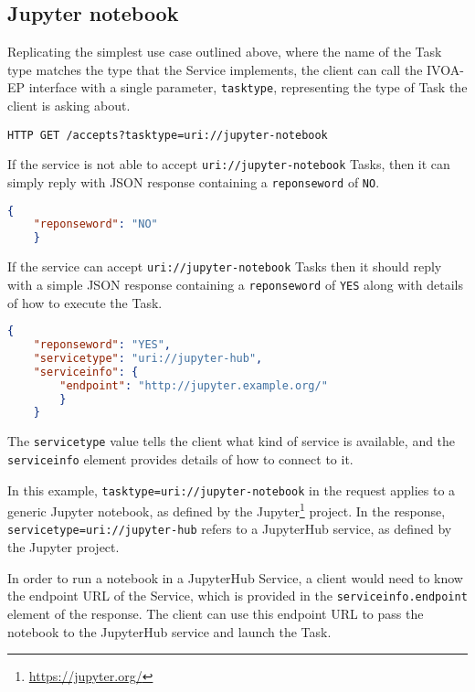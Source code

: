 \documentclass[11pt,a4paper]{ivoa}
\newcommand{\json} {JSON\xspace}
\newcommand{\ivoep} {IVOA-EP\xspace}
\newcommand{\jupyter} {Jupyter\xspace}
\newcommand{\jupyterhub} {JupyterHub\xspace}
\newcommand{\codeword}[1] {\texttt{#1}}
\newcommand{\footurl}[1] {\footnote{\url{#1}}}
\begin{document}
\subsection{Jupyter notebook}
\label{sec:uri://jupyter-notebook}
Replicating the simplest use case outlined above, where the name of the Task type matches the type that the Service implements, the client can call the \ivoep interface with a single parameter, \codeword{tasktype}, representing the type of Task the client is asking about.
\begin{lstlisting}[]
    HTTP GET /accepts?tasktype=uri://jupyter-notebook
\end{lstlisting}

If the service is not able to accept \codeword{uri://jupyter-notebook} Tasks, then it can simply reply with \json response containing a \codeword{reponseword} of \codeword{NO}.
\begin{lstlisting}[language=json]
    {
    "reponseword": "NO"
    }
\end{lstlisting}

If the service can accept \codeword{uri://jupyter-notebook} Tasks then it should reply with a simple \json response containing a \codeword{reponseword} of \codeword{YES} along with details of how to execute the Task.
\begin{lstlisting}[language=json]
    {
    "reponseword": "YES",
    "servicetype": "uri://jupyter-hub",
    "serviceinfo": {
        "endpoint": "http://jupyter.example.org/"
        }
    }
\end{lstlisting}
The \codeword{servicetype} value tells the client what kind of service is available, and the \codeword{serviceinfo} element provides details of how to connect to it.

In this example, \codeword{tasktype=uri://jupyter-notebook} in the request applies to a generic \jupyter notebook, as defined by the \jupyter\footurl{https://jupyter.org/} project. In the response, \codeword{servicetype=uri://jupyter-hub} refers to a \jupyterhub service, as defined by the \jupyter project.

In order to run a notebook in a \jupyterhub Service, a client would need to know the endpoint URL of the Service, which is provided in the \codeword{serviceinfo.endpoint} element of the response. The client can use this endpoint URL to pass the notebook to the \jupyterhub service and launch the Task.
\end{document}
